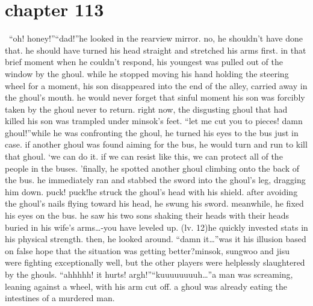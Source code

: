 \section{chapter 113}






 “oh! honey!”“dad!”he looked in the rearview mirror.
 no, he shouldn’t have done that.
 he should have turned his head straight and stretched his arms first.
 in that brief moment when he couldn’t respond, his youngest was pulled out of the window by the ghoul.
while he stopped moving his hand holding the steering wheel for a moment, his son disappeared into the end of the alley, carried away in the ghoul’s mouth.
he would never forget that sinful moment his son was forcibly taken by the ghoul never to return.
right now, the disgusting ghoul that had killed his son was trampled under minsok’s feet.
“let me cut you to pieces! damn ghoul!”while he was confronting the ghoul, he turned his eyes to the bus just in case.
 if another ghoul was found aiming for the bus, he would turn and run to kill that ghoul.
‘we can do it.
 if we can resist like this, we can protect all of the people in the buses.
’finally, he spotted another ghoul climbing onto the back of the bus.
 he immediately ran and stabbed the sword into the ghoul’s leg, dragging him down.
puck! puck!he struck the ghoul’s head with his shield.
 after avoiding the ghoul’s nails flying toward his head, he swung his sword.
 meanwhile, he fixed his eyes on the bus.
he saw his two sons shaking their heads with their heads buried in his wife’s arms…-you have leveled up.
 (lv.
 12)he quickly invested stats in his physical strength.
 then, he looked around.
“damn it…”was it his illusion based on false hope that the situation was getting better?minsok, sungwoo and jisu were fighting exceptionally well, but the other players were helplessly slaughtered by the ghouls.
“ahhhhh! it hurts! argh!”“kuuuuuuuuh…”a man was screaming, leaning against a wheel, with his arm cut off.
 a ghoul was already eating the intestines of a murdered man.

